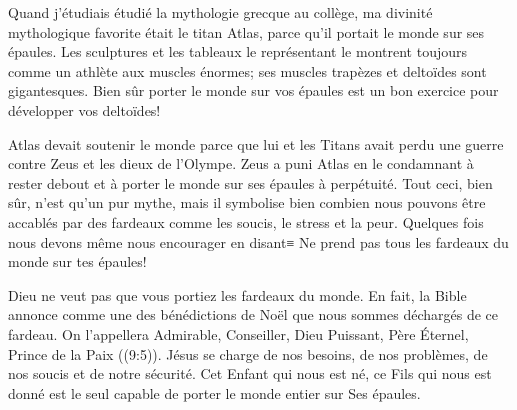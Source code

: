 

Quand j'étudiais étudié la mythologie grecque au collège, ma divinité mythologique favorite était le titan Atlas, parce qu'il portait le monde sur ses épaules. Les sculptures et les tableaux le représentant le montrent toujours comme un athlète aux muscles énormes; ses muscles trapèzes et deltoïdes sont gigantesques. Bien sûr porter le monde sur vos épaules est un bon exercice pour développer vos deltoïdes!

Atlas devait soutenir le monde parce que lui et les Titans avait perdu une guerre contre Zeus et les dieux de l'Olympe. Zeus a puni Atlas en le condamnant à rester debout et à porter le monde sur ses épaules à perpétuité. Tout ceci, bien sûr, n'est qu'un pur mythe, mais il symbolise bien combien nous pouvons être accablés par des fardeaux comme les soucis, le stress et la peur. Quelques fois nous devons même nous encourager en disant≡ \og Ne prend pas tous les fardeaux du monde sur tes épaules! \fg{}

Dieu ne veut pas que vous portiez les fardeaux du monde. En fait, la Bible annonce comme une des bénédictions de Noël que nous sommes déchargés de ce fardeau. \og On l’appellera Admirable, Conseiller, Dieu Puissant, Père Éternel, Prince de la Paix \fg{} ((9:5)). Jésus se charge de nos besoins, de nos problèmes, de nos soucis et de notre sécurité. Cet Enfant qui nous est né, ce Fils qui nous est donné est le seul capable de porter le monde entier sur Ses épaules.



